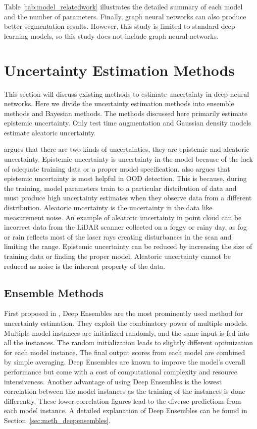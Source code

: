 Table \ref{tab:model_relatedwork} illustrates the detailed summary of each model and the number of parameters.
Finally, graph neural networks \cite{dyn_graph_cnn} can also produce better segmentation results. However, this study is limited to standard deep learning models, so this study does not include graph neural networks.

    \section{Uncertainty Estimation Methods}
    \label{sec:ue_methods}
    This section will discuss existing methods to estimate uncertainty in deep neural networks.
    Here we divide the uncertainty estimation methods into ensemble methods and Bayesian methods.
    The methods discussed here primarily estimate epistemic uncertainty. Only test time augmentation and Gaussian density models estimate aleatoric uncertainty.

    \cite{matias_uncertainty} argues that there are two kinds of uncertainties, they are epistemic and aleatoric uncertainty.
    Epistemic uncertainty is uncertainty in the model because of the lack of adequate training data or a proper model specification.
    \cite{matias_uncertainty} also argues that epistemic uncertainty is most helpful in OOD detection.
    This is because, during the training, model parameters train to a particular distribution of data and
    must produce high uncertainty estimates when they observe data from a different distribution.
    Aleatoric uncertainty is the uncertainty in the data like measurement noise.
    An example of aleatoric uncertainty in point cloud can be incorrect data from the LiDAR scanner collected on a foggy or rainy day, as fog or rain reflects most of the laser rays creating disturbances in the scan and limiting the range.
    Epistemic uncertainty can be reduced by increasing the size of training data or finding the proper model.
    Aleatoric uncertainty cannot be reduced as noise is the inherent property of the data.
    \subsection{Ensemble Methods}
    First proposed in \cite{lakshminarayanan2016simple}, Deep Ensembles are the most prominently used method for uncertainty estimation.
    They exploit the combinatory power of multiple models.
    Multiple model instances are initialized randomly, and the same input is fed into all the instances.
    The random initialization leads to slightly different optimization for each model instance. The final output scores from each model are combined by simple averaging.
    Deep Ensembles are known to improve the model's overall performance but come with a cost of computational complexity and resource intensiveness.
    Another advantage of using Deep Ensembles is the lowest correlation between the model instances as the training of the instances is done differently.
    These lower correlation figures lead to the diverse predictions from each model instance.
    A detailed explanation of Deep Ensembles can be found in Section~\ref{sec:meth_deepensembles}.

